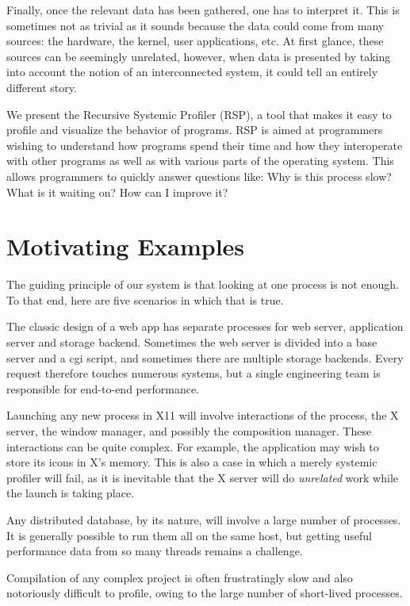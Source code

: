 \documentclass[10pt]{article}
\begin{document}
Finally, once the relevant data has been gathered, one has to interpret it. This is sometimes not as trivial as it sounds because the data could come from many sources: the hardware, the kernel, user applications, etc. At first glance, these sources can be seemingly unrelated, however, when data is  presented by taking into account the notion of an interconnected system, it could tell an entirely different story.

We present the Recursive Systemic Profiler (RSP), a tool that makes it easy to profile and visualize the behavior of programs. RSP is aimed at programmers wishing to understand how programs spend their time and how they interoperate with other programs as well as with various parts of the operating system. This allows programmers to quickly answer questions like: Why is this process slow? What is it waiting on? How can I improve it?

\section{Motivating Examples}

The guiding principle of our system is that looking at one process is not enough.  To that end, here are five scenarios in which that is true.

The classic design of a web app has separate processes for web server, application server and storage backend.  Sometimes the web server is divided into a base server and a cgi script, and sometimes there are multiple storage backends.  Every request therefore touches numerous systems, but a single engineering team is responsible for end-to-end performance.

Launching any new process in X11 will involve interactions of the process, the X server, the window manager, and possibly the composition manager.  These interactions can be quite complex.  For example, the application may wish to store its icons in X's memory.  This is also a case in which a merely systemic profiler will fail, as it is inevitable that the X server will do \emph{unrelated} work while the launch is taking place.

Any distributed database, by its nature, will involve a large number of processes.  It is generally possible to run them all on the same host, but getting useful performance data from so many threads remains a challenge.

Compilation of any complex project is often frustratingly slow and also notoriously difficult to profile, owing to the large number of short-lived processes.
\end{document}
